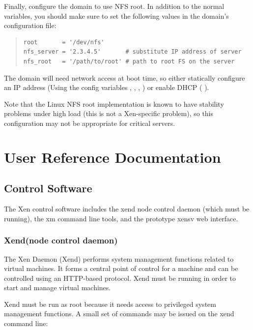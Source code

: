 \documentclass[11pt,twoside,final,openright]{report}
\def\Xend{{Xend}\xspace}
\def\xend{{xend}\xspace}
\begin{document}
Finally, configure the domain to use NFS root.  In addition to the
normal variables, you should make sure to set the following values in
the domain's configuration file:

\begin{quote}
\begin{small}
\begin{verbatim}
root       = '/dev/nfs'
nfs_server = '2.3.4.5'       # substitute IP address of server 
nfs_root   = '/path/to/root' # path to root FS on the server
\end{verbatim}
\end{small}
\end{quote}

The domain will need network access at boot time, so either statically
configure an IP address (Using the config variables , 
, , ) or enable DHCP (
).

Note that the Linux NFS root implementation is known to have stability
problems under high load (this is not a Xen-specific problem), so this
configuration may not be appropriate for critical servers.


\part{User Reference Documentation}

\chapter{Control Software} 

The Xen control software includes the \xend node control daemon (which 
must be running), the xm command line tools, and the prototype 
xensv web interface. 

\section{\Xend (node control daemon)}
\label{s:xend}

The Xen Daemon (\Xend) performs system management functions related to
virtual machines.  It forms a central point of control for a machine
and can be controlled using an HTTP-based protocol.  \Xend must be
running in order to start and manage virtual machines.

\Xend must be run as root because it needs access to privileged system
management functions.  A small set of commands may be issued on the
\xend command line:
\end{document}
